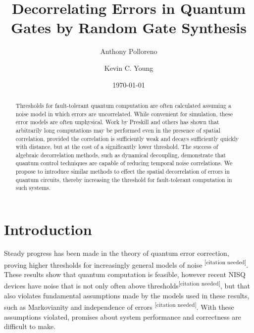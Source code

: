 \documentclass[aps,nofootinbib,pra,notitlepage,twocolumn]{revtex4-1}
\newcommand{\needcite}{{\color{blue}\textsuperscript{[citation needed]}}}
\begin{document}
\tableofcontents
\title{Decorrelating Errors in Quantum Gates by Random Gate Synthesis}

\author{Anthony Polloreno}

\author{Kevin C. Young}

\date{\today}

\begin{abstract}
Thresholds for fault-tolerant quantum computation are often calculated assuming a noise model in which errors are uncorrelated. While convenient for simulation, these error models are often unphysical. Work by Preskill and others has shown that arbitrarily long computations may be performed even in the presence of spatial correlation, provided the correlation is sufficiently weak and decays sufficiently quickly with distance, but at the cost of a significantly lower threshold. The success of algebraic decorrelation methods, such as dynamical decoupling, demonstrate that quantum control techniques are capable of reducing temporal noise correlations. We propose to introduce similar methods to effect the spatial decorrelation of errors in quantum circuits, thereby increasing the threshold for fault-tolerant computation in such systems.
\end{abstract}

\pacs{}

\maketitle

\section{Introduction}

Steady progress has been made in the theory of quantum error correction, proving higher thresholds for increasingly general models of noise \cite{Aharonov2006}\needcite. These results show that quantum computation is feasible, however recent NISQ \cite{Preskill2018} devices have noise that is not only often above thresholds\needcite, but that also violates fundamental assumptions made by the models used in these results, such as Markovianity \cite{Kitaev1997} and independence of errors \needcite. With these assumptions violated, promises about system performance and correctness are difficult to make.
\end{document}
